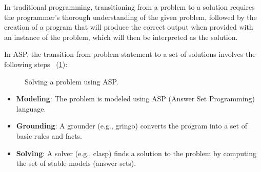 \documentclass[10pt,leqno]{amsart}
\begin{document}
In traditional programming, transitioning from a problem to a solution requires the programmer's thorough understanding of the given problem, followed by the creation of a program that will produce the correct output when provided with an instance of the problem, which will then be interpreted as the solution.

In ASP, the transition from problem statement to a set of solutions involves the following steps \cite{Gebser2013}~(\cref{fig:asp-solving}):

\begin{figure}[htb]
    \begin{center}
    \end{center}
		\caption{Solving a problem using ASP.}
    \label{fig:asp-solving}
\end{figure}

\begin{itemize}
    \item \textbf{Modeling}: The problem is modeled using ASP (Answer Set Programming) language.
    \item \textbf{Grounding}: A grounder (e.g., gringo) converts the program into a set of basic rules and facts.
    \item \textbf{Solving}: A solver (e.g., clasp) finds a solution to the problem by computing the set of stable models (answer sets).
\end{itemize}
\end{document}
